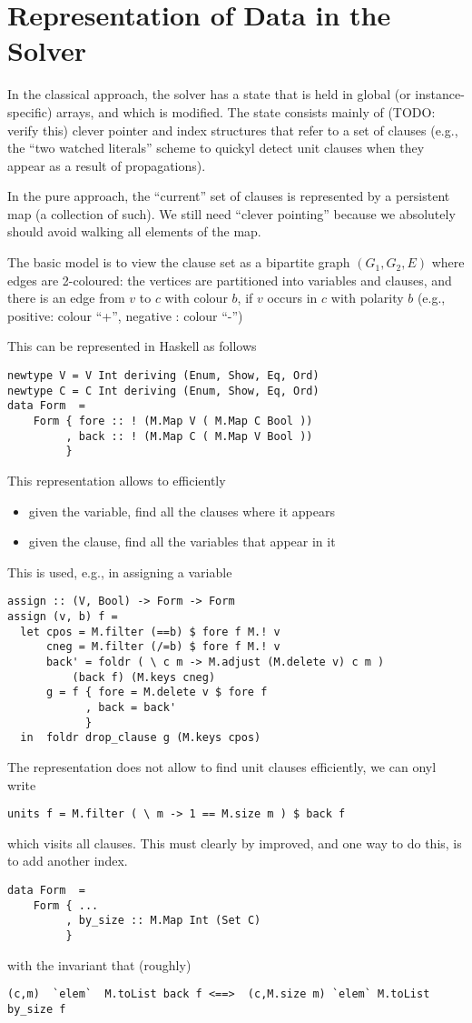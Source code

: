 \section{Representation of Data in the Solver}

In the classical approach, the solver has a state that is held 
in global (or instance-specific) arrays, and which is modified.
The state consists mainly of (TODO: verify this)
clever pointer and index structures that refer to a set of clauses
(e.g., the ``two watched literals'' scheme to quickyl detect unit clauses
when they appear as a result of propagations).

In the pure approach, the ``current'' set of clauses is represented
by a persistent map (a collection of such). We still need ``clever pointing'' 
because we absolutely should avoid walking all elements of the map.

The basic model is to view the clause set as a bipartite graph
$(G_1,G_2,E)$ where edges are 2-coloured:
the vertices are partitioned into variables and clauses,
and there is an edge from $v$ to $c$ with colour $b$,
if $v$ occurs in $c$ with polarity $b$ 
(e.g., positive: colour ``+'', negative : colour ``-'')

This can be represented in Haskell as follows
\begin{verbatim}
newtype V = V Int deriving (Enum, Show, Eq, Ord)
newtype C = C Int deriving (Enum, Show, Eq, Ord)
data Form  =
    Form { fore :: ! (M.Map V ( M.Map C Bool ))
         , back :: ! (M.Map C ( M.Map V Bool ))
         }
\end{verbatim}
This representation allows to efficiently
\begin{itemize}
\item given the variable, find all the clauses where it appears
\item given the clause, find all the variables that appear in it
\end{itemize}

This is used, e.g., in assigning a variable
\begin{verbatim}
assign :: (V, Bool) -> Form -> Form
assign (v, b) f =
  let cpos = M.filter (==b) $ fore f M.! v
      cneg = M.filter (/=b) $ fore f M.! v
      back' = foldr ( \ c m -> M.adjust (M.delete v) c m )
          (back f) (M.keys cneg)
      g = f { fore = M.delete v $ fore f 
            , back = back'
            }
  in  foldr drop_clause g (M.keys cpos)
\end{verbatim}

The representation does not allow to find unit clauses efficiently,
we can onyl write
\begin{verbatim}
units f = M.filter ( \ m -> 1 == M.size m ) $ back f
\end{verbatim}
which visits all clauses. This must clearly by improved,
and one way to do this, is to add another index.
\begin{verbatim}
data Form  =
    Form { ...
         , by_size :: M.Map Int (Set C)
         }
\end{verbatim}
with the invariant that (roughly)
\begin{verbatim}
(c,m)  `elem`  M.toList back f <==>  (c,M.size m) `elem` M.toList by_size f
\end{verbatim}

